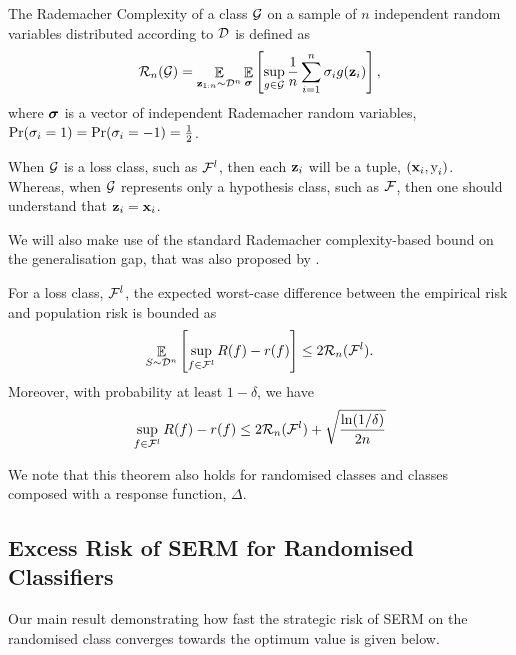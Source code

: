 \begin{definition}
The Rademacher Complexity of a class ${\mathcal{G}}$ on a sample of $n$ independent random variables distributed according to ${\mathcal{D}}$ is defined as
\begin{equation*}
    {\mathcal{R}}_n({\mathcal{G}}) = \mathop{\mathbb{E}}_{{\mathbf{z}}_{1:n} \sim {\mathcal{D}}^n} \mathop{\mathbb{E}}_{{\bm{\sigma}}}\left [\sup_{g \in {\mathcal{G}}} \frac{1}{n} \sum_{i=1}^{n} \sigma_{i} g({\mathbf{z}}_i) \right],
\end{equation*}
where ${\bm{\sigma}}$ is a vector of independent Rademacher random variables, $\Pr(\sigma_i = 1) = \Pr(\sigma_i = -1) = \frac{1}{2}$.
\end{definition}
When ${\mathcal{G}}$ is a loss class, such as ${\mathcal{F}}^l$, then each ${\mathbf{z}}_i$ will be a tuple, $({\mathbf{x}}_i, {\textnormal{y}}_i)$. Whereas, when ${\mathcal{G}}$ represents only a hypothesis class, such as ${\mathcal{F}}$, then one should understand that ${\mathbf{z}}_i = {\mathbf{x}}_i$.

We will also make use of the standard Rademacher complexity-based bound on the generalisation gap, that was also proposed by \citet{bartlett2002rademacher, shalev-shwartz2014}.

\begin{theorem}
    For a loss class, ${\mathcal{F}}^l$, the expected worst-case difference between the empirical risk and population risk is bounded as
    \begin{equation*}
        \mathop{\mathbb{E}}_{S \sim {\mathcal{D}}^n} \left[ \sup_{f \in \mathcal{F}^l}R(f) - r(f)\right] \leq 2{\mathcal{R}}_n({\mathcal{F}}^l).
    \end{equation*}
    Moreover, with probability at least $1-\delta$, we have
    \begin{equation*}
        \sup_{f \in \mathcal{F}^l}R(f) - r(f) \leq 2{\mathcal{R}}_n({\mathcal{F}}^l) + \sqrt{\frac{\ln(1/\delta)}{2n}}
    \end{equation*}
    \label{thm:rademacher-iid}
\end{theorem}
We note that this theorem also holds for randomised classes and classes composed with a response function, $\Delta$.

\newcommand{\qhs}{\hat{Q}}
\newcommand{\qhsbr}{\Delta_{\hat{Q}}}
\newcommand{\qa}{Q^\ast}
\newcommand{\qabr}{\Delta_{Q^\ast}}
\newcommand{\qbr}{\Delta_{Q}}

\subsection{Excess Risk of SERM for Randomised Classifiers}
Our main result demonstrating how fast the strategic risk of SERM on the randomised class converges towards the optimum value is given below.

